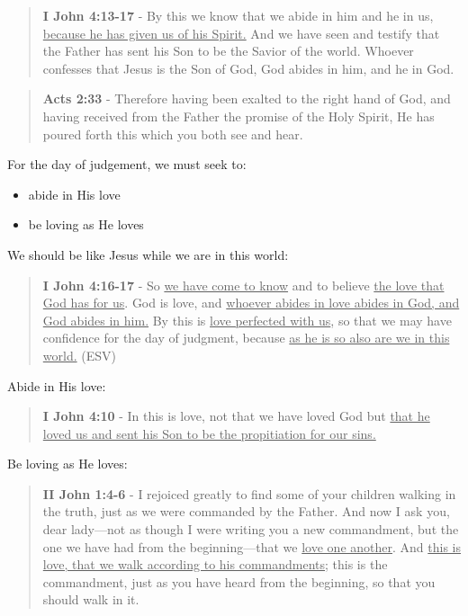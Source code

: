 \documentclass[11pt]{article}
\begin{document}
\begin{quote}
\textbf{I John 4:13-17} - By this we know that we abide in him and he in us, \uline{because he has given us of his Spirit.} And we have seen and testify that the Father has sent his Son to be the Savior of the world. Whoever confesses that Jesus is the Son of God, God abides in him, and he in God.
\end{quote}

\begin{quote}
\textbf{Acts 2:33} - Therefore having been exalted to the right hand of God, and having received from the Father the promise of the Holy Spirit, He has poured forth this which you both see and hear.
\end{quote}

For the day of judgement, we must seek to:
\begin{itemize}
\item abide in His love
\item be loving as He loves
\end{itemize}

We should be like Jesus while we are in this world:

\begin{quote}
\textbf{I John 4:16-17} - So \uline{we have come to know} and to believe \uline{the love that God has for us}. God is love, and \uline{whoever abides in love abides in God, and God abides in him.} By this is \uline{love perfected with us}, so that we may have confidence for the day of judgment, because \uline{as he is so also are we in this world.} (ESV)
\end{quote}

Abide in His love:

\begin{quote}
\textbf{I John 4:10} - In this is love, not that we have loved God but \uline{that he loved us and sent his Son to be the propitiation for our sins.}
\end{quote}

Be loving as He loves:

\begin{quote}
\textbf{II John 1:4-6} - I rejoiced greatly to find some of your children walking in the truth, just as we were commanded by the Father. And now I ask you, dear lady—not as though I were writing you a new commandment, but the one we have had from the beginning—that we \uline{love one another}. And \uline{this is love, that we walk according to his commandments}; this is the commandment, just as you have heard from the beginning, so that you should walk in it.
\end{quote}
\end{document}
